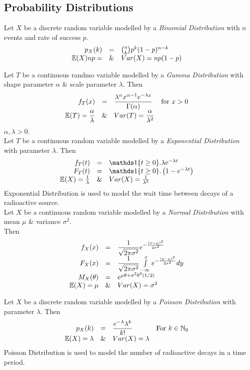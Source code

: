 \documentclass[11pt,a4paper]{article}
\begin{document}
\subsection{Probability Distributions}

Let $X$ be a discrete random variable modelled by a \textit{Binomial Distribution} with $n$ events and rate of success $p$.\\
\[\begin{array}{rcl}
p_X(k)&=&{n\choose k}p^k(1-p)^{n-k}\\
\mathbb{E}(X)np=&\&&Var(X)=np(1-p)
\end{array}\]

Let $T$ be a continuous randmo variable modelled by a \textit{Gamma Distribution} with shape parameter $\alpha$ \& scale parameter $\lambda$. Then
\[\begin{array}{rcll}
f_T(x)&=&\dfrac{\lambda^\alpha x^{\alpha-1}e^{-\lambda x}}{\Gamma(\alpha)}&\mathrm{for\ }x>0\\
\mathbb{E}(T)=\dfrac{\alpha}{\lambda}&\&&Var(T)=\dfrac{\alpha}{\lambda^2}
\end{array}\]
\nb $\alpha,\lambda>0$.\\

Let $T$ be a continuous random variable modelled by a \textit{Exponential Distribution} with parameter $\lambda$. Then
\[\begin{array}{rcl}
f_T(t)&=&\indicator\{t\geq0\}.\lambda e^{-\lambda t}\\
F_T(t)&=&\indicator\{t\geq0\}.\left(1-e^{-\lambda t}\right)\\
\expect(X)=\frac{1}{\lambda}&\&&Var(X)=\frac{1}{\lambda^2}
\end{array}\]
\nb Exponential Distribution is used to model the wait time between decays of a radioactive source.\\

Let $X$ be a continuous random variable modelled by a \textit{Normal Distribution} with mean $\mu$ \& variance $\sigma^2$.\\
Then
\[\begin{array}{rcl}
f_X(x)&=&\dfrac{1}{\sqrt{2\pi\sigma^2}}e^{-\frac{(x-\mu)^2}{2\sigma^2}}\\
F_X(x)&=&\dfrac{1}{\sqrt{2\pi\sigma^2}}\int\limits_{-\infty}^xe^{-\frac{(y-\mu)^2}{2\sigma^2}}dy\\
M_X(\theta)&=&e^{\mu\theta+\sigma^2\theta^2(1/2)}\\
\mathbb{E}(X)=\mu&\&&Var(X)=\sigma^2
\end{array}\]

Let $X$ be a discrete random variable modelled by a \textit{Poisson Distribution} with parameter $\lambda$. Then
\[\begin{array}{rcll}
p_X(k)&=&\dfrac{e^{-\lambda}\lambda^k}{k!}&\mathrm{For\ }k\in\nats_0\\
\expect(X)=\lambda&\&&Var(X)=\lambda
\end{array}\]
\nb Poisson Distribution is used to model the number of radioactive decays in a time period.\\
\end{document}

